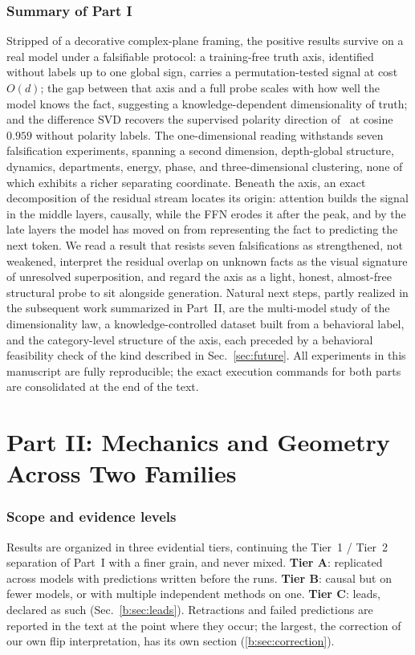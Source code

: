 \documentclass[11pt]{article}
\begin{document}
\section{Summary of Part I}

Stripped of a decorative complex-plane framing, the positive results survive
on a real model under a falsifiable protocol: a training-free truth axis,
identified without labels up to one global sign, carries a permutation-tested
signal at cost $O(d)$; the gap between that axis and a full probe scales with
how well the model knows the fact, suggesting a knowledge-dependent
dimensionality of truth; and the difference SVD recovers the supervised
polarity direction of~\cite{burger2024} at cosine $0.959$ without polarity
labels. The one-dimensional reading withstands seven falsification
experiments, spanning a second dimension, depth-global structure, dynamics,
departments, energy, phase, and three-dimensional clustering, none of which
exhibits a richer separating coordinate. Beneath the axis, an exact
decomposition of the residual stream locates its origin: attention builds the
signal in the middle layers, causally, while the FFN erodes it after the
peak, and by the late layers the model has moved on from representing the
fact to predicting the next token. We read a result that resists seven
falsifications as strengthened, not weakened, interpret the residual overlap
on unknown facts as the visual signature of unresolved superposition, and
regard the axis as a light, honest, almost-free structural probe to sit
alongside generation. Natural next steps, partly realized in the subsequent
work summarized in Part~II, are the multi-model study
of the dimensionality law, a knowledge-controlled dataset built from a
behavioral label, and the category-level structure of the axis, each preceded
by a behavioral feasibility check of the kind described in
Sec.~\ref{sec:future}. All experiments in this manuscript are fully reproducible; the exact execution commands for both parts are consolidated at the end of the text.


\part*{Part II: Mechanics and Geometry Across Two Families}
\section{Scope and evidence levels}
\label{b:sec:scope}

Results are organized in three evidential tiers, continuing the
Tier~1 / Tier~2 separation of Part~I with a finer grain, and never mixed.
\textbf{Tier A}: replicated across models with predictions written before
the runs. \textbf{Tier B}: causal but on fewer models, or with multiple
independent methods on one. \textbf{Tier C}: leads, declared as such
(Sec.~\ref{b:sec:leads}). Retractions and failed predictions are reported in
the text at the point where they occur; the largest, the correction of our
own flip interpretation, has its own section (\ref{b:sec:correction}).
\end{document}
